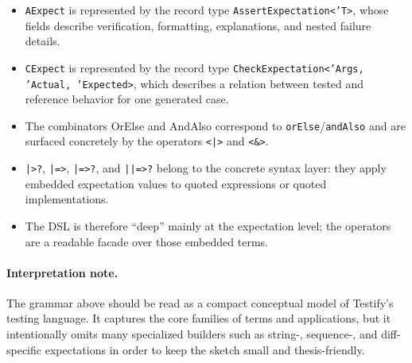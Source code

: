 \begin{itemize}
\item \texttt{AExpect} is represented by the record type \texttt{AssertExpectation<'T>}, whose fields
      describe verification, formatting, explanations, and nested failure details.
\item \texttt{CExpect} is represented by the record type
      \texttt{CheckExpectation<'Args, 'Actual, 'Expected>}, which describes a relation between tested
      and reference behavior for one generated case.
\item The combinators \textsf{OrElse} and \textsf{AndAlso} correspond to
      \texttt{orElse}/\texttt{andAlso} and are surfaced concretely by the operators
      \texttt{<|>} and \texttt{<&>}.
\item \texttt{|>?}, \texttt{|=>}, \texttt{|=>?}, and \texttt{||=>?} belong to the concrete syntax
      layer: they apply embedded expectation values to quoted expressions or quoted implementations.
\item The DSL is therefore ``deep'' mainly at the expectation level; the operators are a readable
      facade over those embedded terms.
\end{itemize}

\paragraph{Interpretation note.}
The grammar above should be read as a compact conceptual model of Testify's testing language. It
captures the core families of terms and applications, but it intentionally omits many specialized
builders such as string-, sequence-, and diff-specific expectations in order to keep the sketch small
and thesis-friendly.
